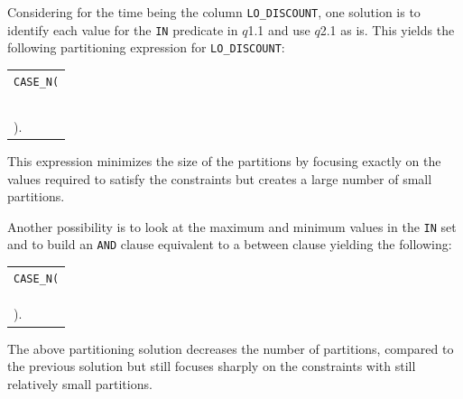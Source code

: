 \documentclass[runningheads]{comsis2}
\begin{document}
Considering for the time being the column {\tt LO\_DISCOUNT}, 
one solution is to identify each value 
for the {\tt IN} predicate in $q$1.1 
and use $q$2.1 as is. This yields the following partitioning expression 
for {\tt LO\_DISCOUNT}:
\vspace{-.05in}
\begin{center}
{\footnotesize
\begin{tabular}{l}
{\tt CASE\_N(} \\
\hspace{0.1in}{\tt LO\_DISCOUNT = 1,} \\
\hspace{0.1in}{\tt LO\_DISCOUNT = 4,} \\
\hspace{0.1in}{\tt LO\_DISCOUNT = 5,} \\
\hspace{0.1in}{\tt LO\_DISCOUNT >= 7,} \\
\hspace{0.1in}{\tt NO CASE OR UNKNOWN} \\
{)}. \\
\end{tabular}
}
\end{center}
This expression minimizes the size of the partitions 
by focusing exactly on the values required to satisfy the constraints 
but creates a large number of small partitions. 

Another possibility is to look at the maximum and minimum 
values in the {\tt IN} set and to build an {\tt AND} clause equivalent to 
a between clause yielding the following:
\vspace{-.1in}
\begin{center}
\begin{tabular}{l}
{\tt CASE\_N(} \\
\hspace{0.1in}{\tt LO\_DISCOUNT >= 1 AND LO\_DISCOUNT <= 5,} \\
\hspace{0.1in}{\tt LO\_DISCOUNT >= 7,} \\
\hspace{0.1in}{\tt NO CASE OR UNKNOWN} \\
{)}. \\
\end{tabular}
\vspace{-.1in}
\end{center}

\noindent The above partitioning solution decreases the number of partitions, 
compared to the previous solution but still focuses sharply on the constraints 
with still relatively small partitions. 
\end{document}
